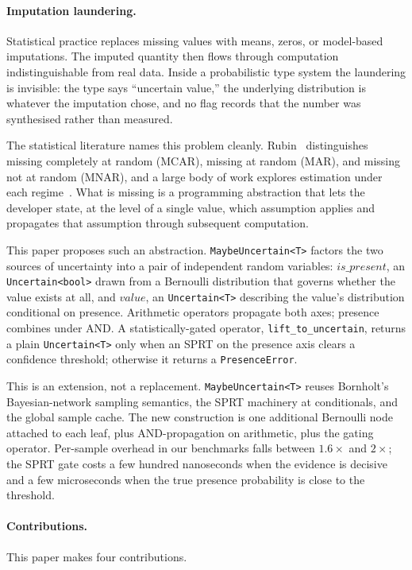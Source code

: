 \paragraph{Imputation laundering.} Statistical practice replaces missing
values with means, zeros, or model-based imputations. The imputed quantity then
flows through computation indistinguishable from real data. Inside a
probabilistic type system the laundering is invisible: the type says
``uncertain value,'' the underlying distribution is whatever the imputation
chose, and no flag records that the number was synthesised rather than
measured.

\medskip

The statistical literature names this problem cleanly. Rubin~\cite{rubin1976missing}
distinguishes missing completely at random (MCAR), missing at random (MAR), and
missing not at random (MNAR), and a large body of work explores estimation
under each regime~\cite{littlerubin2019}. What is missing is a programming
abstraction that lets the developer state, at the level of a single value,
which assumption applies and propagates that assumption through subsequent
computation.

This paper proposes such an abstraction. \texttt{MaybeUncertain<T>} factors
the two sources of uncertainty into a pair of independent random variables:
$\mathit{is\_present}$, an \texttt{Uncertain<bool>} drawn from a Bernoulli
distribution that governs whether the value exists at all, and
$\mathit{value}$, an \texttt{Uncertain<T>} describing the value's distribution
conditional on presence. Arithmetic operators propagate both axes; presence
combines under AND. A statistically-gated operator,
\texttt{lift\_to\_uncertain}, returns a plain \texttt{Uncertain<T>} only when
an SPRT on the presence axis clears a confidence threshold; otherwise it
returns a \texttt{PresenceError}.

This is an extension, not a replacement. \texttt{MaybeUncertain<T>} reuses
Bornholt's Bayesian-network sampling semantics, the SPRT machinery at
conditionals, and the global sample cache. The new construction is one
additional Bernoulli node attached to each leaf, plus AND-propagation on
arithmetic, plus the gating operator. Per-sample overhead in our benchmarks
falls between $1.6\times$ and $2\times$; the SPRT gate costs a few hundred
nanoseconds when the evidence is decisive and a few microseconds when the true
presence probability is close to the threshold.

\paragraph{Contributions.} This paper makes four contributions.

